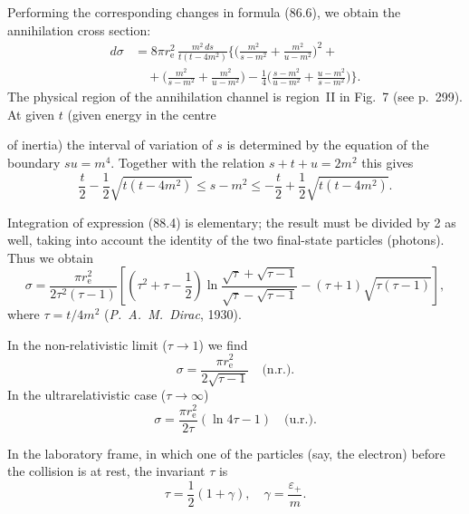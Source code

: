 Performing the corresponding changes in formula (86.6), we obtain the annihilation cross section:
\begin{equation}
\begin{split}
d\sigma &= 8\pi r_\mathrm{e}^2\,\frac{m^2\,ds}{t(t-4m^2)}\biggl\{\biggl(\frac{m^2}{s-m^2} + \frac{m^2}{u-m^2}\biggr)^{\!2} + {} \\
&\quad {} + \biggl(\frac{m^2}{s-m^2} + \frac{m^2}{u-m^2}\biggr) - \frac{1}{4}\biggl(\frac{s-m^2}{u-m^2} + \frac{u-m^2}{s-m^2}\biggr)\biggr\}.
\end{split}
\label{eq:88.4}
\end{equation}
The physical region of the annihilation channel is region~II in Fig.~7 (see p.~299). At given $t$ (given energy in the centre


of inertia) the interval of variation of $s$ is determined by the equation of the boundary $su = m^4$. Together with the relation $s + t + u = 2m^2$ this gives
\begin{equation}
\frac{t}{2} - \frac{1}{2}\sqrt{t(t-4m^2)} \leqslant s - m^2 \leqslant -\frac{t}{2} + \frac{1}{2}\sqrt{t(t-4m^2)}.
\label{eq:88.5}
\end{equation}

Integration of expression (88.4) is elementary; the result must be divided by 2 as well, taking into account the identity of the two final-state particles (photons). Thus we obtain
\begin{equation}
\sigma = \frac{\pi r_\mathrm{e}^2}{2\tau^2(\tau - 1)}\left[\left(\tau^2 + \tau - \frac{1}{2}\right)\ln\frac{\sqrt{\tau}+\sqrt{\tau-1}}{\sqrt{\tau}-\sqrt{\tau-1}} - (\tau+1)\sqrt{\tau(\tau-1)}\right],
\label{eq:88.6}
\end{equation}
where $\tau = t/4m^2$ (\emph{P.~A.~M.~Dirac}, 1930).

In the non-relativistic limit ($\tau \to 1$) we find
\begin{equation}
\sigma = \frac{\pi r_\mathrm{e}^2}{2\sqrt{\tau-1}} \quad \text{(n.r.)}.
\label{eq:88.7}
\end{equation}
In the ultrarelativistic case ($\tau \to \infty$)
\begin{equation}
\sigma = \frac{\pi r_\mathrm{e}^2}{2\tau}(\ln 4\tau - 1) \quad \text{(u.r.)}.
\label{eq:88.8}
\end{equation}

In the laboratory frame, in which one of the particles (say, the electron) before the collision is at rest, the invariant $\tau$ is
\begin{equation}
\tau = \frac{1}{2}(1 + \gamma), \quad \gamma = \frac{\varepsilon_+}{m}.
\label{eq:88.9}
\end{equation}

